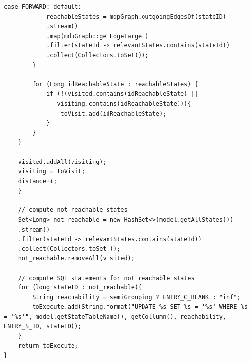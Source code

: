 \documentclass[preview]{standalone}
\begin{document}
\begin{lstlisting}[style=javaStyle, caption={grp Function java}]
			case FORWARD: default:
			reachableStates = mdpGraph.outgoingEdgesOf(stateID)
			.stream()
			.map(mdpGraph::getEdgeTarget)
			.filter(stateId -> relevantStates.contains(stateId))
			.collect(Collectors.toSet());
		}
		
		for (Long idReachableState : reachableStates) {
			if (!(visited.contains(idReachableState) ||
			   visiting.contains(idReachableState))){
				toVisit.add(idReachableState);
			}
		}
	}
	
	visited.addAll(visiting);
	visiting = toVisit;
	distance++;
	}
	
	// compute not reachable states
	Set<Long> not_reachable = new HashSet<>(model.getAllStates())
	.stream()
	.filter(stateId -> relevantStates.contains(stateId))
	.collect(Collectors.toSet());
	not_reachable.removeAll(visited);
	
	// compute SQL statements for not reachable states
	for (long stateID : not_reachable){
		String reachability = semiGrouping ? ENTRY_C_BLANK : "inf";
		toExecute.add(String.format("UPDATE %s SET %s = '%s' WHERE %s = '%s'", model.getStateTableName(), getCollumn(), reachability, ENTRY_S_ID, stateID));
	}
	return toExecute;
}
\end{lstlisting}
\end{document}
